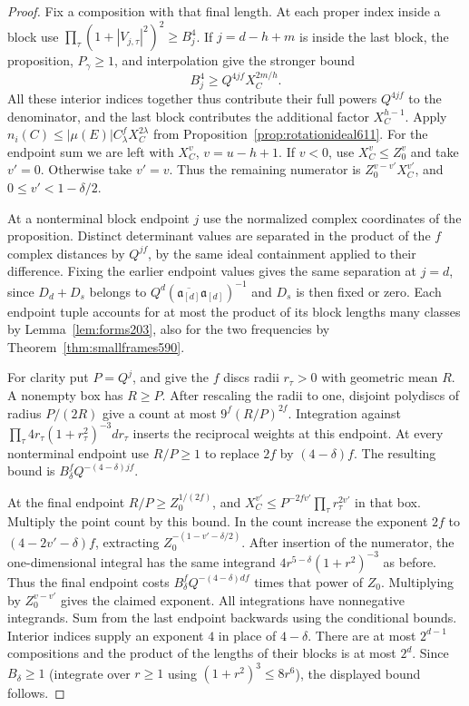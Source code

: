 \documentclass[a4paper,11pt]{article}
\theoremstyle{definition}
\theoremstyle{remark}
\numberwithin{equation}{section}
\begin{document}
\begin{proof}
Fix a composition with that final length. At each proper index
inside a block use
\(\prod_\tau(1+|V_{j,\tau}|^2)^2\ge B_j^4\).
If \(j=d-h+m\) is inside the last block, the proposition,
\(P_\gamma\ge1\), and interpolation give the stronger bound
\[
                  B_j^4\ge Q^{4jf} X_C^{2m/h}.
\]
All these interior indices together thus contribute their full
powers \(Q^{4jf}\) to the denominator, and the last block contributes
the additional factor \(X_C^{h-1}\).
Apply \(n_i(C)\le|\mu(E)|C_\lambda^f X_C^{2\lambda}\) from
Proposition~\ref{prop:rotationideal611}. For the endpoint sum we
are left with \(X_C^{v}\), \(v=u-h+1\). If \(v<0\), use
\(X_C^{v}\le Z_0^{v}\) and take \(v'=0\). Otherwise take \(v'=v\).
Thus the remaining numerator is \(Z_0^{v-v'}X_C^{v'}\), and
\(0\le v'<1-\delta/2\).

At a nonterminal block endpoint \(j\) use the normalized complex
coordinates of the proposition. Distinct determinant values are
separated in the product of the \(f\) complex distances by
\(Q^{jf}\), by the same ideal containment applied to their
difference. Fixing the earlier endpoint values gives the same
separation at \(j=d\), since \(D_d+D_s\) belongs to
\(Q^d(\overline{\mathfrak a_{[d]}}\mathfrak a_{[d]})^{-1}\)
and \(D_s\) is then fixed or zero. Each endpoint tuple accounts
for at most the product of its block lengths many classes by
Lemma~\ref{lem:forms203}, also for the two frequencies by
Theorem~\ref{thm:smallframes590}.

For clarity put \(P=Q^j\), and give the \(f\) discs radii
\(r_\tau>0\) with geometric mean \(R\). A nonempty box has
\(R\ge P\). After rescaling the radii to one, disjoint polydiscs of
radius \(P/(2R)\) give a count at most \(9^f(R/P)^{2f}\).
Integration against \(\prod_\tau4r_\tau(1+r_\tau^2)^{-3}dr_\tau\)
inserts the reciprocal weights at this endpoint. At every
nonterminal endpoint use \(R/P\ge1\) to replace \(2f\) by
\((4-\delta)f\). The resulting bound is
\(B_\delta^f Q^{-(4-\delta)jf}\).

At the final endpoint \(R/P\ge Z_0^{1/(2f)}\), and
\(X_C^{v'}\le P^{-2fv'}\prod_\tau r_\tau^{2v'}\) in that box.
Multiply the point count by this bound. In the count increase
the exponent \(2f\) to \((4-2v'-\delta)f\), extracting
\(Z_0^{-(1-v'-\delta/2)}\). After insertion of the numerator,
the one-dimensional integral has the same integrand
\(4r^{5-\delta}(1+r^2)^{-3}\) as before. Thus the final endpoint
costs \(B_\delta^f Q^{-(4-\delta)df}\) times that power of \(Z_0\).
Multiplying by \(Z_0^{v-v'}\) gives the claimed exponent.
All integrations have nonnegative integrands. Sum from the last
endpoint backwards using the conditional bounds. Interior indices
supply an exponent \(4\) in place of \(4-\delta\).
There are at most \(2^{d-1}\) compositions and the product of the
lengths of their blocks is at most \(2^d\). Since \(B_\delta\ge1\)
(integrate over \(r\ge1\) using \((1+r^2)^3\le8r^6\)),
the displayed bound follows.
\end{proof}
\end{document}
